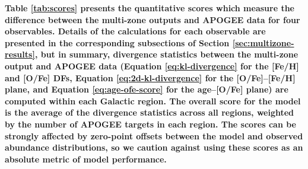 \documentclass[twocolumn,twocolappendix,linenumbers]{aastex631}
\begin{document}
{\bf Table \ref{tab:scores} presents the quantitative scores which measure the difference between the multi-zone outputs and APOGEE data for four observables. Details of the calculations for each observable are presented in the corresponding subsections of Section \ref{sec:multizone-results}, but in summary, divergence statistics between the multi-zone output and APOGEE data (Equation \ref{eq:kl-divergence} for the [Fe/H] and [O/Fe] DFs, Equation \ref{eq:2d-kl-divergence} for the [O/Fe]--[Fe/H] plane, and Equation \ref{eq:age-ofe-score} for the age--[O/Fe] plane) are computed within each Galactic region. The overall score for the model is the average of the divergence statistics across all regions, weighted by the number of APOGEE targets in each region. The scores can be strongly affected by zero-point offsets between the model and observed abundance distributions, so we caution against using these scores as an absolute metric of model performance.}


\end{document}
